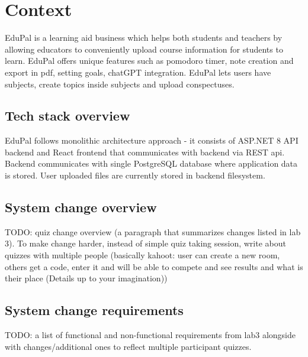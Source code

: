 \section{Context}

EduPal is a learning aid business which helps both students and teachers by allowing educators to conveniently upload course information for students to learn. EduPal offers unique features such as pomodoro timer, note creation and export in pdf, setting goals, chatGPT integration. EduPal lets users have subjects, create topics inside subjects and upload conspectuses.

\subsection{Tech stack overview}

EduPal follows monolithic architecture approach - it consists of ASP.NET 8 API backend and React frontend that communicates with backend via REST api. Backend communicates with single PostgreSQL database where application data is stored. User uploaded files are currently stored in backend filesystem.

\subsection{System change overview}

TODO: quiz change overview (a paragraph that summarizes changes listed in lab 3). To make change harder, instead of simple quiz taking session, write about quizzes with multiple people (basically kahoot: user can create a new room, others get a code, enter it and will be able to compete and see results and what is their place (Details up to your imagination))

\subsection{System change requirements}

TODO: a list of functional and non-functional requirements from lab3 alongside with changes/additional ones to reflect multiple participant quizzes.
